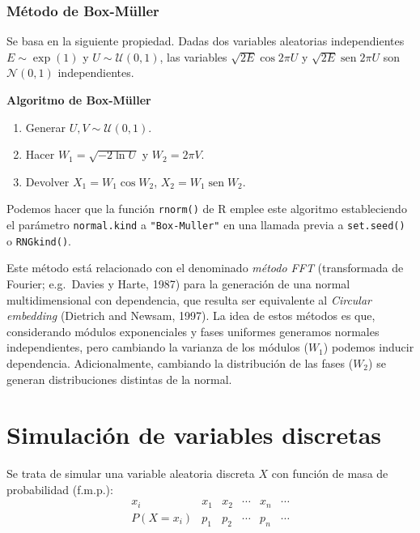 \documentclass[
]{book}
\theoremstyle{break}
\theoremstyle{definition}
\theoremstyle{definition}
\theoremstyle{definition}
\theoremstyle{definition}
\theoremstyle{remark}
\begin{document}
\hypertarget{muxe9todo-de-box-muxfcller}{%
\subsection{Método de Box-Müller}\label{muxe9todo-de-box-muxfcller}}

Se basa en la siguiente propiedad. Dadas dos variables aleatorias independientes \(E \sim \exp\left( 1\right)\) y
\(U \sim \mathcal{U}( 0, 1 )\), las variables
\(\sqrt{2E} \cos 2\pi U\) y \(\sqrt{2E}\operatorname{sen} 2\pi U\) son
\(\mathcal{N}( 0, 1 )\) independientes.

\textbf{Algoritmo de Box-Müller}

\begin{enumerate}
\def\labelenumi{\arabic{enumi}.}
\item
  Generar \(U,V\sim \mathcal{U}( 0, 1 )\).
\item
  Hacer \(W_1=\sqrt{-2\ln U}\) y \(W_2=2\pi V\).
\item
  Devolver \(X_1=W_1\cos W_2\), \(X_2=W_1\operatorname{sen}W_2\).
\end{enumerate}

Podemos hacer que la función \texttt{rnorm()} de R emplee este algoritmo estableciendo el parámetro \texttt{normal.kind} a \texttt{"Box-Muller"} en una llamada previa a \texttt{set.seed()} o \texttt{RNGkind()}.

Este método está relacionado con el denominado \emph{método FFT} (transformada de Fourier; e.g.~Davies y Harte, 1987) para la generación de una normal multidimensional con dependencia, que resulta ser equivalente al \emph{Circular embedding} (Dietrich and Newsam, 1997).
La idea de estos métodos es que, considerando módulos exponenciales y fases uniformes generamos normales independientes, pero cambiando la varianza de los módulos (\(W_1\)) podemos inducir dependencia.
Adicionalmente, cambiando la distribución de las fases (\(W_2\)) se generan distribuciones distintas de la normal.

\hypertarget{discretas}{%
\chapter{Simulación de variables discretas}\label{discretas}}

Se trata de simular una variable aleatoria discreta \(X\) con función de masa de
probabilidad (f.m.p.):
\[\begin{array}{l|ccccc}
 x_{i}  &  x_{1}  &  x_{2}  &  \cdots   &  x_{n}  &  \cdots   \\ \hline
 P\left( X=x_{i}\right)   &  p_{1}  &  p_{2}  &  \cdots   &  p_{n}  &  
\cdots  
\end{array}\]
\end{document}
